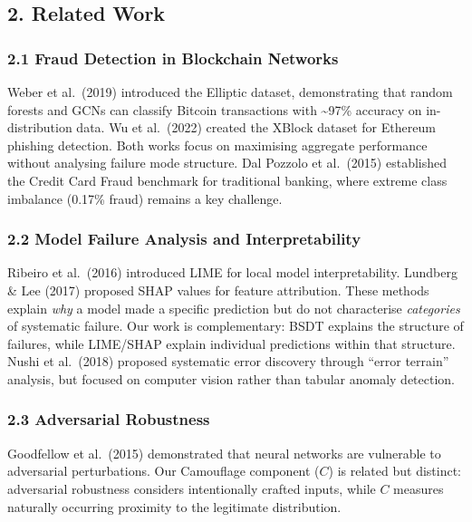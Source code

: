\documentclass[
  11pt,
]{article}
\begin{document}
\subsection{2. Related Work}\label{related-work}

\subsubsection{2.1 Fraud Detection in Blockchain
Networks}\label{fraud-detection-in-blockchain-networks}

Weber et al.~(2019) introduced the Elliptic dataset, demonstrating that
random forests and GCNs can classify Bitcoin transactions with
\textasciitilde97\% accuracy on in-distribution data. Wu et al.~(2022)
created the XBlock dataset for Ethereum phishing detection. Both works
focus on maximising aggregate performance without analysing failure mode
structure. Dal Pozzolo et al.~(2015) established the Credit Card Fraud
benchmark for traditional banking, where extreme class imbalance (0.17\%
fraud) remains a key challenge.

\subsubsection{2.2 Model Failure Analysis and
Interpretability}\label{model-failure-analysis-and-interpretability}

Ribeiro et al.~(2016) introduced LIME for local model interpretability.
Lundberg \& Lee (2017) proposed SHAP values for feature attribution.
These methods explain \emph{why} a model made a specific prediction but
do not characterise \emph{categories} of systematic failure. Our work is
complementary: BSDT explains the structure of failures, while LIME/SHAP
explain individual predictions within that structure. Nushi et
al.~(2018) proposed systematic error discovery through “error terrain”
analysis, but focused on computer vision rather than tabular anomaly
detection.

\subsubsection{2.3 Adversarial Robustness}\label{adversarial-robustness}

Goodfellow et al.~(2015) demonstrated that neural networks are
vulnerable to adversarial perturbations. Our Camouflage component
(\(C\)) is related but distinct: adversarial robustness considers
intentionally crafted inputs, while \(C\) measures naturally occurring
proximity to the legitimate distribution.
\end{document}
